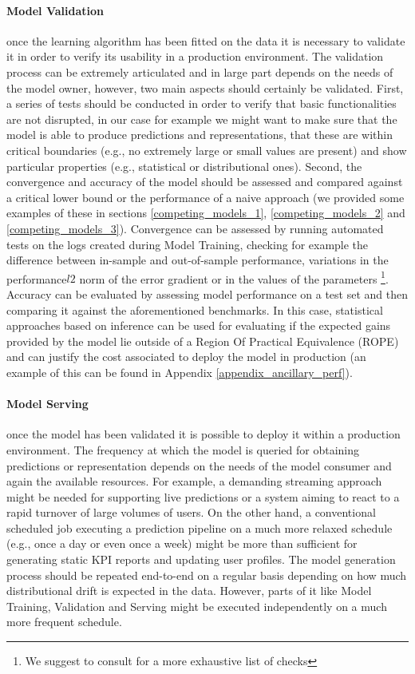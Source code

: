 \paragraph*{Model Validation} once the learning algorithm has been fitted on the data it is necessary to validate it in order to verify its usability in a production environment. The validation process can be extremely articulated and in large part depends on the needs of the model owner, however, two main aspects should certainly be validated. First, a series of tests should be conducted in order to verify that basic functionalities are not disrupted, in our case for example we might want to make sure that the model is able to produce predictions and representations, that these are within critical boundaries (e.g., no extremely large or small values are present) and show particular properties (e.g., statistical or distributional ones). Second, the convergence and accuracy of the model should be assessed and compared against a critical lower bound or the performance of a naive approach (we provided some examples of these in sections \ref{competing_models_1}, \ref{competing_models_2} and \ref{competing_models_3}). Convergence can be assessed by running automated tests on the logs created during Model Training, checking for example the difference between in-sample and out-of-sample performance, variations in the performance$l2$ norm of the error gradient or in the values of the parameters \footnote{We suggest to consult \cite{bengio2017deep} for a more exhaustive list of checks}. Accuracy can be evaluated by assessing model performance on a test set and then comparing it against the aforementioned benchmarks. In this case, statistical approaches based on inference can be used for evaluating if the expected gains provided by the model lie outside of a Region Of Practical Equivalence (ROPE) and can justify the cost associated to deploy the model in production (an example of this can be found in Appendix \ref{appendix_ancillary_perf}).

\paragraph*{Model Serving} once the model has been validated it is possible to deploy it within a production environment. The frequency at which the model is queried for obtaining predictions or representation depends on the needs of the model consumer and again the available resources. For example, a demanding streaming approach might be needed for supporting live predictions or a system aiming to react to a rapid turnover of large volumes of users. On the other hand, a conventional scheduled job executing a prediction pipeline on a much more relaxed schedule (e.g., once a day or even once a week) might be more than sufficient for generating static KPI reports and updating user profiles. The model generation process should be repeated end-to-end on a regular basis depending on how much distributional drift is expected in the data. However, parts of it like Model Training, Validation and Serving might be executed independently on a much more frequent schedule. 

